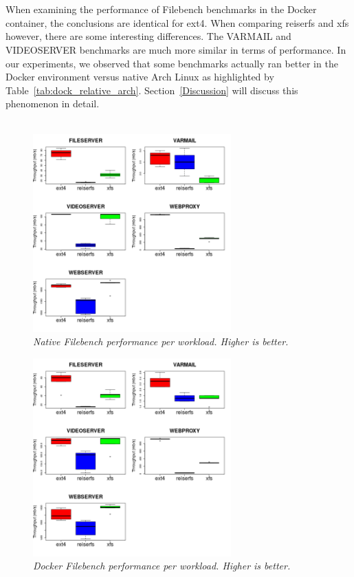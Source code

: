 \documentclass[letterpaper,twocolumn,10pt]{article}
\begin{document}
\noindent{}
\\\\

When examining the performance of Filebench benchmarks in the Docker container, the conclusions are identical for ext4. When comparing reiserfs and xfs however, there are some interesting differences. The VARMAIL and VIDEOSERVER benchmarks are much more similar in terms of performance. In our experiments, we observed that some benchmarks actually ran better in the Docker environment versus native Arch Linux as highlighted by Table~\ref{tab:dock_relative_arch}. Section~\ref{Discussion} will discuss this phenomenon in detail. 
\\

\noindent{}
\\


\begin{figure}[!ht]
\centering
\includegraphics[width=3in]{../results/arch_workload_boxplots.png}
\caption{\textit{Native Filebench performance per workload. Higher is better.}}
\label{fig:arch_workload_boxplots}
\end{figure}

\begin{figure}[!ht]
\centering
\includegraphics[width=3in]{../results/dock_workload_boxplots.png}
\caption{\textit{Docker Filebench performance per workload. Higher is better.}}
\label{fig:dock_workload_boxplots}
\end{figure}
\end{document}

